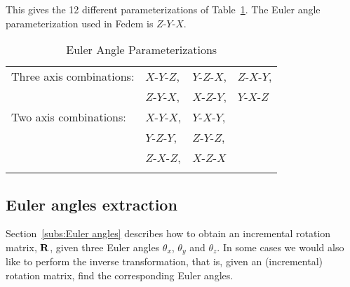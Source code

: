This gives the 12 different parameterizations of Table~\ref{tab:EulerAngles}.
The Euler angle parameterization used in Fedem is $Z$-$Y$-$X$.
%
\begin{table}[b]
\caption{Euler Angle Parameterizations}
\begin{center}
\begin{tabular}{llll}
\noalign{\hrule\smallskip}
Three axis combinations: & $X$-$Y$-$Z$, & $Y$-$Z$-$X$, & $Z$-$X$-$Y$, \\
                         & $Z$-$Y$-$X$, & $X$-$Z$-$Y$, & $Y$-$X$-$Z$  \\
\noalign{\smallskip\hrule\smallskip}
Two axis combinations:   & $X$-$Y$-$X$, & $Y$-$X$-$Y$, \\
                         & $Y$-$Z$-$Y$, & $Z$-$Y$-$Z$, \\
                         & $Z$-$X$-$Z$, & $X$-$Z$-$X$  \\
\noalign{\smallskip\hrule}
\end{tabular}
\end{center}
\label{tab:EulerAngles}
\end{table}

\subsection{Euler angles extraction}
\label{subs:Euler angles extraction}

Section~\ref{subs:Euler angles} describes how to obtain an incremental rotation
matrix, $\bf R$, given three Euler angles $\theta_x$, $\theta_y$ and $\theta_z$.
In some cases we would also like to perform the inverse transformation, that is,
given an (incremental) rotation matrix, find the corresponding Euler angles.

